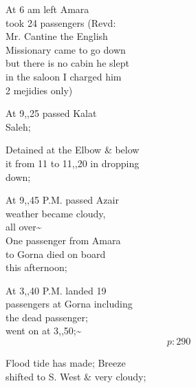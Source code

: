 \documentclass{report}
\begin{document}
	\par{
 	At 6 am left Amara\ \\took 24 passengers (Revd:\ \\Mr. Cantine the English\ \\Missionary came to go down\ \\but there is no cabin he slept\ \\in the saloon I charged him\ \\2 mejidies only)\ \\
	}

	\par{
 	At 9,,25 passed Kalat\ \\Saleh;\ \\
	}

	\par{
 	Detained at the Elbow \& below\ \\it from 11 to 11,,20 in dropping\ \\down;\ \\
	}

	\par{
 	At 9,,45 P.M. passed Azair\ \\weather became cloudy,\ \\all over\~{}\ \\One passenger from Amara\ \\to Gorna died on board\ \\this afternoon;\ \\
	}

	\par{
 	At 3,,40 P.M. landed 19\ \\passengers at Gorna including\ \\the dead passenger;\ \\went on at 3,,50;\~{}\ \\
  \[p: 290 \]

	}


	\par{
 	Flood tide has made; Breeze\ \\shifted to S. West \& very cloudy;\ \\
	}
\end{document}
